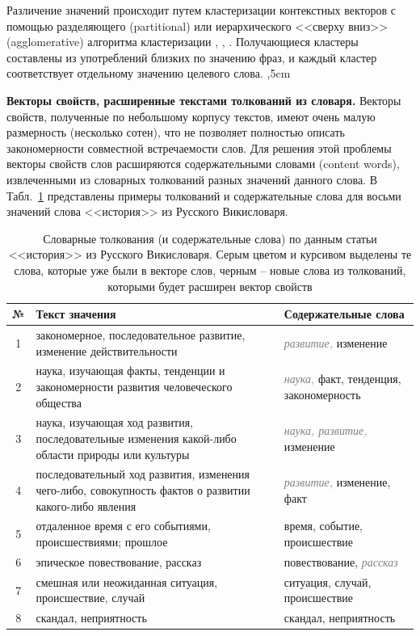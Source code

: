 \documentclass{article}
\begin{document}
\begin{articletext}
Различение значений происходит путем кластеризации контекстных векторов с помощью разделяющего (partitional) или иерархического <<сверху вниз>> (agglomerative) алгоритма кластеризации \cite{Jain 1999}, \cite{Jain 1988}, \cite{Zhao 2002}.  Получающиеся кластеры составлены из употреблений близких по значению фраз, и каждый кластер соответствует отдельному значению целевого слова. 
,5cm

\textbf{Векторы свойств, расширенные текстами толкований из словаря.} Векторы свойств, полученные по небольшому корпусу текстов, имеют очень малую размерность (несколько сотен), что не позволяет полностью описать закономерности совместной встречаемости слов. Для решения этой проблемы векторы свойств слов расширяются содержательными словами (content words), извлеченными из словарных толкований разных значений данного слова. В Табл.~\ref{tbl2} представлены примеры толкований и содержательные слова для восьми значений слова <<история>> из Русского Викисловаря.

\bfullwidth
\begin{table}[H]
\centering
\caption{Словарные толкования (и содержательные слова) по данным статьи <<история>> из Русского Викисловаря. Серым цветом и курсивом выделены те слова, которые уже были в векторе слов, черным – новые слова из толкований, которыми будет расширен вектор свойств}
\begin{tabular}{|c|m{10cm}|m{5cm}|}

\hline
№ & Текст значения & Содержательные слова\\
\hline
1 & закономерное, последовательное развитие, изменение действительности & \textit{\textcolor{gray}{развитие,}} изменение\\
\hline
2 & наука, изучающая факты, тенденции и закономерности развития человеческого общества & \textit{\textcolor{gray}{наука,}} факт, тенденция, закономерность\\
\hline
3 & наука, изучающая ход развития, последовательные изменения какой-либо области природы или культуры & \textit{\textcolor{gray}{наука, развитие,}} изменение\\
\hline
4 & последовательный ход развития, изменения чего-либо, совокупность фактов о развитии какого-либо явления & \textit{\textcolor{gray}{развитие,}} изменение, факт\\
\hline
5 & отдаленное время с его событиями, происшествиями; прошлое & время, событие, происшествие\\
\hline
6 & эпическое повествование, рассказ & повествование, \textit{\textcolor{gray}{рассказ}}\\
\hline
7 & смешная или неожиданная ситуация, происшествие, случай & ситуация, случай, происшествие\\
\hline
8 & скандал, неприятность & скандал, неприятность\\
\hline
\end{tabular}
\label{tbl2}
\end{table}
\efullwidth


\end{articletext}
\end{document}
